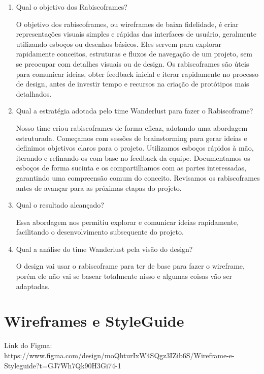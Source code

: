 \documentclass{article}
\begin{document}
\begin{enumerate}
      \item Qual o objetivo dos Rabiscoframes?

            O objetivo dos rabiscoframes, ou wireframes de baixa fidelidade, é criar representações visuais simples e rápidas das interfaces de usuário, geralmente utilizando esboços ou desenhos básicos. Eles servem para explorar rapidamente conceitos, estruturas e fluxos de navegação de um projeto, sem se preocupar com detalhes visuais ou de design. Os rabiscoframes são úteis para comunicar ideias, obter feedback inicial e iterar rapidamente no processo de design, antes de investir tempo e recursos na criação de protótipos mais detalhados.

      \item Qual a estratégia adotada pelo time Wanderlust para fazer o Rabiscoframe?

            Nosso time criou rabiscoframes de forma eficaz, adotando uma abordagem estruturada. Começamos com sessões de brainstorming para gerar ideias e definimos objetivos claros para o projeto. Utilizamos esboços rápidos à mão, iterando e refinando-os com base no feedback da equipe. Documentamos os esboços de forma sucinta e os compartilhamos com as partes interessadas, garantindo uma compreensão comum do conceito. Revisamos os rabiscoframes antes de avançar para as próximas etapas do projeto.

      \item Qual o resultado alcançado?

            Essa abordagem nos permitiu explorar e comunicar ideias rapidamente, facilitando o desenvolvimento subsequente do projeto.

      \item Qual a análise do time Wanderlust pela visão do design?

            O design vai usar o rabiscoframe para ter de base para fazer o wireframe, porém ele não vai se basear totalmente nisso e algumas coisas vão ser adaptadas.

\end{enumerate}

\section{Wireframes e StyleGuide}
Link do Figma: https://www.figma.com/design/moQhturIxW4SQgz3IZib6S/Wireframe-e-Styleguide?t=GJ7Wh7Qk90H3Gi74-1
\end{document}
